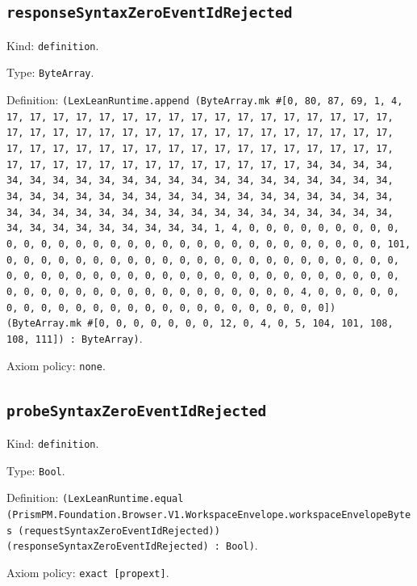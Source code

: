 \documentclass[11pt]{article}
\begin{document}
\subsection*{\texttt{responseSyntaxZeroEventIdRejected}}
\noindent Kind: \texttt{definition}.\par
\noindent Type: \texttt{ByteArray}.\par
\noindent Definition: \texttt{(LexLeanRuntime.append (ByteArray.mk \#[0, 80, 87, 69, 1, 4, 17, 17, 17, 17, 17, 17, 17, 17, 17, 17, 17, 17, 17, 17, 17, 17, 17, 17, 17, 17, 17, 17, 17, 17, 17, 17, 17, 17, 17, 17, 17, 17, 17, 17, 17, 17, 17, 17, 17, 17, 17, 17, 17, 17, 17, 17, 17, 17, 17, 17, 17, 17, 17, 17, 17, 17, 17, 17, 17, 17, 17, 17, 17, 17, 34, 34, 34, 34, 34, 34, 34, 34, 34, 34, 34, 34, 34, 34, 34, 34, 34, 34, 34, 34, 34, 34, 34, 34, 34, 34, 34, 34, 34, 34, 34, 34, 34, 34, 34, 34, 34, 34, 34, 34, 34, 34, 34, 34, 34, 34, 34, 34, 34, 34, 34, 34, 34, 34, 34, 34, 34, 34, 34, 34, 34, 34, 34, 34, 1, 4, 0, 0, 0, 0, 0, 0, 0, 0, 0, 0, 0, 0, 0, 0, 0, 0, 0, 0, 0, 0, 0, 0, 0, 0, 0, 0, 0, 0, 0, 0, 0, 101, 0, 0, 0, 0, 0, 0, 0, 0, 0, 0, 0, 0, 0, 0, 0, 0, 0, 0, 0, 0, 0, 0, 0, 0, 0, 0, 0, 0, 0, 0, 0, 0, 0, 0, 0, 0, 0, 0, 0, 0, 0, 0, 0, 0, 0, 0, 0, 0, 0, 0, 0, 0, 0, 0, 0, 0, 0, 0, 0, 0, 0, 0, 0, 4, 0, 0, 0, 0, 0, 0, 0, 0, 0, 0, 0, 0, 0, 0, 0, 0, 0, 0, 0, 0, 0, 0, 0, 0]) (ByteArray.mk \#[0, 0, 0, 0, 0, 0, 0, 12, 0, 4, 0, 5, 104, 101, 108, 108, 111]) : ByteArray)}.\par
\noindent Axiom policy: \texttt{none}.\par
\subsection*{\texttt{probeSyntaxZeroEventIdRejected}}
\noindent Kind: \texttt{definition}.\par
\noindent Type: \texttt{Bool}.\par
\noindent Definition: \texttt{(LexLeanRuntime.equal (PrismPM.Foundation.Browser.V1.WorkspaceEnvelope.workspaceEnvelopeBytes (requestSyntaxZeroEventIdRejected)) (responseSyntaxZeroEventIdRejected) : Bool)}.\par
\noindent Axiom policy: \texttt{exact [propext]}.\par
\end{document}
